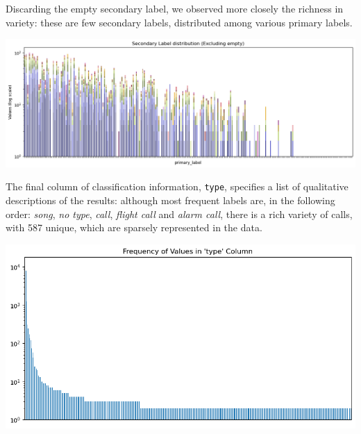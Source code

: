 \documentclass[10pt]{article}
\begin{document}
\vspace{1em}

\begin{minipage}{0.48\linewidth}
Discarding the empty secondary label, we observed more closely the richness in variety: these are few secondary labels, distributed among various primary labels.
\end{minipage}
\hfill
\begin{minipage}{0.48\linewidth}
  \includegraphics[width=\linewidth]{img/train_secondary_sand_nonempty.png}
\end{minipage}

\vspace{1em}

\begin{minipage}{0.48\linewidth}
The final column of classification information, \texttt{type}, specifies a list of qualitative descriptions of the results: although most frequent labels are, in the following order: \textit{song}, \textit{no type}, \textit{call}, \textit{flight call} and \textit{alarm call}, there is a rich variety of calls, with 587 unique, which are sparsely represented in the data.
\end{minipage}
\hfill
\begin{minipage}{0.48\linewidth}
  \includegraphics[width=\linewidth]{img/train_type_histogram.png}
\end{minipage}
\end{document}
